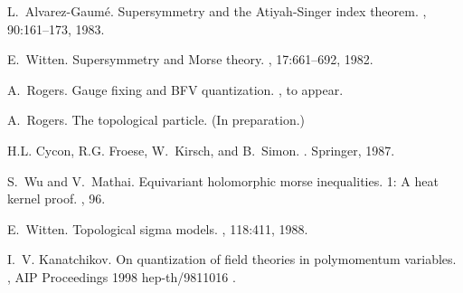 \documentclass[a4paper,fleqn,12pt]{article}
\begin{document}
\begin{thebibliography}{9}
L.~Alvarez-Gaum\'e.
\newblock Supersymmetry and the {A}tiyah-{S}inger index theorem.
, 90:161--173, 1983.

E.~Witten.
\newblock Supersymmetry and {M}orse theory.
, 17:661--692, 1982.

A.~Rogers.
\newblock Gauge fixing and {BFV} quantization.
, \newblock to appear.

A.~Rogers.
\newblock The topological particle. \newblock (In preparation.)

H.L. Cycon, R.G. Froese, W.~Kirsch, and B.~Simon.
.
\newblock Springer, 1987.

S.~Wu and V.~Mathai.
\newblock Equivariant holomorphic morse inequalities. 1: A heat kernel proof.
, 96.

E.~Witten.
\newblock Topological sigma models.
, 118:411, 1988.

I.~V. Kanatchikov.
\newblock On quantization of field theories in polymomentum variables.
,
  \newblock AIP Proceedings 1998 \newblock hep-th/9811016 .

\end{thebibliography}
\end{document}
